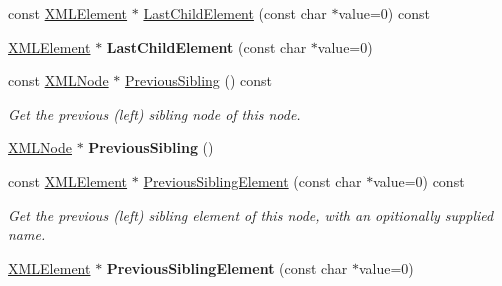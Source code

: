 \begin{DoxyCompactItemize}
\item 
const \hyperlink{classtinyxml2_1_1XMLElement}{X\+M\+L\+Element} $\ast$ \hyperlink{classtinyxml2_1_1XMLNode_a0cb35cd79e93f802a1506b6b517c331c}{Last\+Child\+Element} (const char $\ast$value=0) const
\item 
\mbox{\label{classtinyxml2_1_1XMLNode_a125423acf3170b130634638c5afc0639}} 
\hyperlink{classtinyxml2_1_1XMLElement}{X\+M\+L\+Element} $\ast$ {\bfseries Last\+Child\+Element} (const char $\ast$value=0)
\item 
\mbox{\label{classtinyxml2_1_1XMLNode_aac667c513d445f8b783e1e15ef9d3551}} 
const \hyperlink{classtinyxml2_1_1XMLNode}{X\+M\+L\+Node} $\ast$ \hyperlink{classtinyxml2_1_1XMLNode_aac667c513d445f8b783e1e15ef9d3551}{Previous\+Sibling} () const
\begin{DoxyCompactList}\small\item\em Get the previous (left) sibling node of this node. \end{DoxyCompactList}\item 
\mbox{\label{classtinyxml2_1_1XMLNode_ae760e5e7e766df1d2cf3bb4a847876d6}} 
\hyperlink{classtinyxml2_1_1XMLNode}{X\+M\+L\+Node} $\ast$ {\bfseries Previous\+Sibling} ()
\item 
\mbox{\label{classtinyxml2_1_1XMLNode_ab8195130fe48a176732d3d843a6b5990}} 
const \hyperlink{classtinyxml2_1_1XMLElement}{X\+M\+L\+Element} $\ast$ \hyperlink{classtinyxml2_1_1XMLNode_ab8195130fe48a176732d3d843a6b5990}{Previous\+Sibling\+Element} (const char $\ast$value=0) const
\begin{DoxyCompactList}\small\item\em Get the previous (left) sibling element of this node, with an opitionally supplied name. \end{DoxyCompactList}\item 
\mbox{\label{classtinyxml2_1_1XMLNode_ae9177fdc49cb89879f333581d5f734f1}} 
\hyperlink{classtinyxml2_1_1XMLElement}{X\+M\+L\+Element} $\ast$ {\bfseries Previous\+Sibling\+Element} (const char $\ast$value=0)
\item 
\mbox{\label{classtinyxml2_1_1XMLNode_a79db9ef0fe014d27790f2218b87bcbb5}} 

\end{DoxyCompactItemize}
